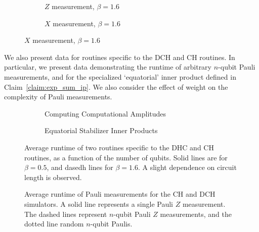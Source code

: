 \begin{figure}[p]
\begin{subfigure}[t]{0.42\textwidth}
\begin{scaletikzpicturetowidth}{\textwidth}
    \end{scaletikzpicturetowidth}
\end{subfigure}
\begin{subfigure}[t]{0.42\textwidth}
    \centering
    \caption{$Z$ measurement, $\beta=1.6$}
    \begin{scaletikzpicturetowidth}{\textwidth}
        
    \end{scaletikzpicturetowidth}
\end{subfigure}
\begin{subfigure}[t]{0.42\textwidth}
    \centering
    \caption{$X$ measurement, $\beta=1.6$}
    \begin{scaletikzpicturetowidth}{\textwidth}
        
    \end{scaletikzpicturetowidth}
\end{subfigure}
\end{figure}
We also present data for routines specific to the DCH and CH routines. In particular, we present data demonstrating the runtime of arbitrary $n$-qubit Pauli measurements, and for the specialized `equatorial' inner product defined in Claim~\ref{claim:exp_sum_ip}. We also consider the effect of weight on the complexity of Pauli measurements.
\begin{figure}[p]
\centering
\begin{subfigure}[t]{0.48\textwidth}
\centering
\caption{Computing Computational Amplitudes}
\label{fig:amp_comparison}
    \begin{scaletikzpicturetowidth}{\textwidth}
        
    \end{scaletikzpicturetowidth}
\end{subfigure}
\begin{subfigure}[t]{0.48\textwidth}
\centering
    \caption{Equatorial Stabilizer Inner Products}
    \label{fig:eq_ip_comparison}
    \begin{scaletikzpicturetowidth}{\textwidth}
        
    \end{scaletikzpicturetowidth}
\end{subfigure}
\caption{Average runtime of two routines specific to the DHC and CH routines, as a function of the number of qubits. Solid lines are for $\beta=0.5$, and dasedh lines for $\beta=1.6$. A slight dependence on circuit length is observed.}
\label{fig:other_routines}
\end{figure}
\begin{figure}[p]
\caption{Average runtime of Pauli measurements for the CH and DCH simulators. A solid line represents a single Pauli $Z$ measurement. The dashed lines represent $n$-qubit Pauli $Z$ measurements, and the dotted line random $n$-qubit Paulis.}
\centering
\begin{scaletikzpicturetowidth}{0.75\textwidth}
    
\end{scaletikzpicturetowidth}
\label{fig:measurement_comparison}
\end{figure}
